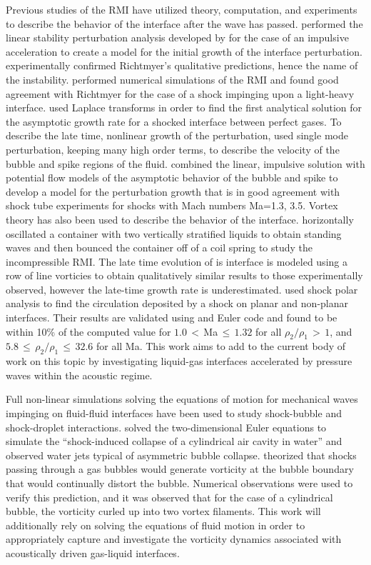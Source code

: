 Previous studies of the \ac{RMI} have utilized theory, computation,
and experiments to describe the behavior of the interface after the
wave has passed. \cite{Richtmyer1960} performed the linear stability
perturbation analysis developed by \cite{Taylor1950} for the case of
an impulsive acceleration to create a model for the initial growth of
the interface perturbation. \cite{Meshkov1969} experimentally
confirmed Richtmyer's qualitative predictions, hence the name of the
instability. \cite{Meyer1972} performed numerical simulations of the
\ac{RMI} and found good agreement with Richtmyer for the case of a
shock impinging upon a light-heavy interface. \cite{Fraley1986} used
Laplace transforms in order to find the first analytical solution for
the asymptotic growth rate for a shocked interface between perfect
gases. To describe the late time, nonlinear growth of the
perturbation, \cite{Zhang1997} used single mode perturbation, keeping
many high order terms, to describe the velocity of the bubble and
spike regions of the fluid. \cite{Sadot1998} combined the linear,
impulsive solution with potential flow models of the asymptotic
behavior of the bubble and spike to develop a model for the
perturbation growth that is in good agreement with shock tube
experiments for shocks with Mach numbers Ma=1.3, 3.5. Vortex theory
has also been used to describe the behavior of the
interface. \cite{Jacobs1996} horizontally oscillated a container with
two vertically stratified liquids to obtain standing waves and then
bounced the container off of a coil spring to study the incompressible
\ac{RMI}. The late time evolution of is interface is modeled using a
row of line vorticies to obtain qualitatively similar results to those
experimentally observed, however the late-time growth rate is
underestimated. \cite{Samtaney1994} used shock polar analysis to find
the circulation deposited by a shock on planar and non-planar
interfaces. Their results are validated using and Euler code and found
to be within 10\% of the computed value for $1.0\,<\,$Ma$\,\leq\,1.32$
for all $\rho_2/\rho_1\,>\,1$, and
$5.8\,\leq\,\rho_2/\rho_1\,\leq\,32.6$ for all Ma. This work aims to
add to the current body of work on this topic by investigating
liquid-gas interfaces accelerated by pressure waves within the
acoustic regime.

Full non-linear simulations solving the equations of motion for
mechanical waves impinging on fluid-fluid interfaces have been used to
study shock-bubble and shock-droplet interactions. \cite{Ball2000}
solved the two-dimensional Euler equations to simulate the
``shock-induced collapse of a cylindrical air cavity in water'' and
observed water jets typical of asymmetric bubble
collapse. \cite{Picone1998} theorized that shocks passing through a
gas bubbles would generate vorticity at the bubble boundary that would
continually distort the bubble. Numerical observations were used to
verify this prediction, and it was observed that for the case of a
cylindrical bubble, the vorticity curled up into two vortex
filaments. This work will additionally rely on solving the equations
of fluid motion in order to appropriately capture and investigate the
vorticity dynamics associated with acoustically driven gas-liquid
interfaces.



